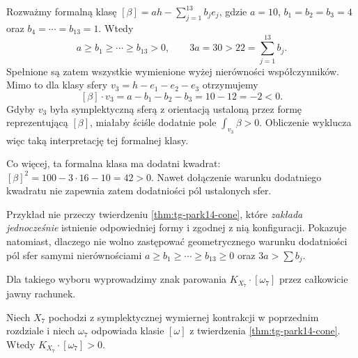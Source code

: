 \begin{przyklad}
\label{ex:tg-park14-cone-not-sufficient}
Rozważmy formalną klasę
$[\beta]=a h-\sum_{j=1}^{13}b_j e_j$,
gdzie $a=10$, $b_1=b_2=b_3=4$
oraz $b_4=\cdots=b_{13}=1$.
Wtedy
\[
a\ge b_1\ge\cdots\ge b_{13}>0,
\qquad 3a=30>22=\sum_{j=1}^{13}b_j.
\]
Spełnione są zatem wszystkie wymienione
wyżej nierówności współczynników.
Mimo to dla klasy sfery
$v_3=h-e_1-e_2-e_3$
otrzymujemy
\[
[\beta]\cdot v_3=a-b_1-b_2-b_3=10-12=-2<0.
\]
Gdyby $v_3$ była symplektyczną sferą
z orientacją ustaloną przez formę
reprezentującą $[\beta]$, miałaby
ściśle dodatnie pole
$\int_{v_3}\beta>0$. Obliczenie
wyklucza więc taką interpretację
tej formalnej klasy.

Co więcej, ta formalna klasa ma dodatni kwadrat:
$[\beta]^2=100-3\cdot16-10=42>0$.
Nawet dołączenie warunku dodatniego kwadratu nie
zapewnia zatem dodatniości pól ustalonych sfer.

Przykład nie przeczy twierdzeniu
\ref{thm:tg-park14-cone}, które
\emph{zakłada jednocześnie}
istnienie odpowiedniej formy
i zgodnej z nią konfiguracji.
Pokazuje natomiast, dlaczego nie
wolno zastępować geometrycznego
warunku dodatniości pól sfer
samymi nierównościami
$a\ge b_1\ge\cdots\ge b_{13}\ge0$
oraz $3a>\sum b_j$.
\end{przyklad}

Dla takiego wyboru wyprowadzimy znak parowania
$K_{X_7}\cdot[\omega_7]$ przez całkowicie jawny rachunek.

\begin{twierdzenie}
\label{thm:tg-park14-positive}
Niech $X_7$ pochodzi z symplektycznej wymiernej kontrakcji
w poprzednim rozdziale i niech $\omega_7$ odpowiada klasie
$[\omega]$ z twierdzenia \ref{thm:tg-park14-cone}.
Wtedy $K_{X_7}\cdot[\omega_7]>0$.
\end{twierdzenie}

